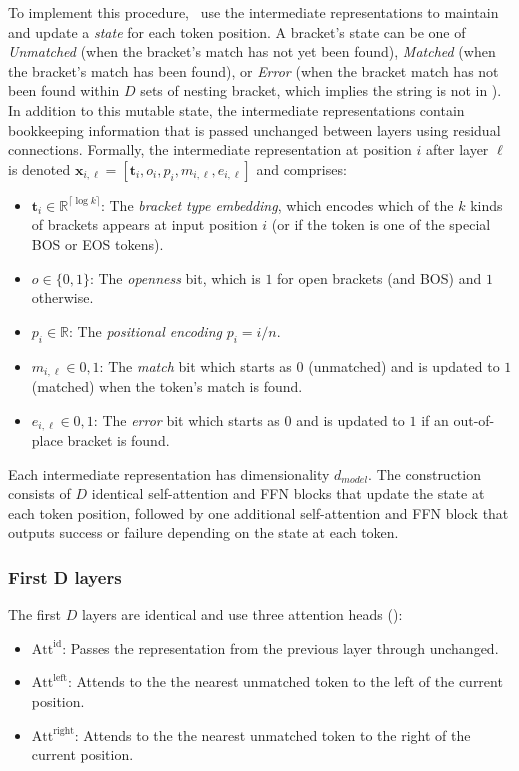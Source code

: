 To implement this procedure,~\citet{yao-2021-self-attention} use the intermediate representations to maintain and update a \textit{state} for each token position. A bracket's state can be one of \textit{Unmatched} (when the bracket's match has not yet been found), \textit{Matched} (when the bracket's match has been found), or \textit{Error} (when the bracket match has not been found within $D$ sets of nesting bracket, which implies the string is not in ). In addition to this mutable state, the intermediate representations contain bookkeeping information that is passed unchanged between layers using residual connections. Formally, the intermediate representation at position $i$ after layer $\ell$ is denoted $\mathbf{x}_{i,\ell} = [\mathbf{t}_i, o_i, p_i, m_{i,\ell}, e_{i,\ell}]$ and comprises:\begin{itemize}
    \item $\mathbf{t}_i \in \mathbb{R}^{\lceil\log k\rceil}$: The \textit{bracket type embedding}, which encodes which of the $k$ kinds of brackets appears at input position $i$ (or if the token is one of the special BOS or EOS tokens).
    \item $o \in \{0,1\}$: The \textit{openness} bit, which is $1$ for open brackets (and BOS) and $1$ otherwise.
    \item $p_i \in \mathbb{R}$: The \textit{positional encoding} $p_i = i/n$.
    \item $m_{i,\ell} \in {0,1}$: The \textit{match} bit which starts as $0$ (unmatched) and is updated to $1$ (matched) when the token's match is found.
    \item $e_{i,\ell} \in {0,1}$: The \textit{error} bit which starts as $0$ and is updated to $1$ if an out-of-place bracket is found.
\end{itemize}
Each intermediate representation has dimensionality $d_{model}$. The construction consists of $D$ identical self-attention and FFN blocks that update the state at each token position, followed by one additional self-attention and FFN block that outputs success or failure depending on the state at each token.

\subsubsection{First D layers}
The first $D$ layers are identical and use three attention heads ():\begin{itemize}
    \item $\mathrm{Att}^{\mathrm{id}}$: Passes the representation from the previous layer through unchanged.
    \item $\mathrm{Att}^{\mathrm{left}}$: Attends to the the nearest unmatched token to the left of the current position.
    \item $\mathrm{Att}^{\mathrm{right}}$: Attends to the the nearest unmatched token to the right of the current position.
\end{itemize}

